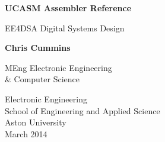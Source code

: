 %
%
%
\begin{titlepage}
  \begin{center}
    \vspace*{1cm}

    \Huge
    \textbf{UCASM Assembler Reference}

    \vspace{0.5cm}
    \LARGE
    EE4DSA Digital Systems Design

    \vspace{1.5cm}

    \textbf{Chris Cummins}

    \vfill

    MEng Electronic Engineering\\
    \& Computer Science

    \vspace{0.8cm}

    \Large
    Electronic Engineering\\
    School of Engineering and Applied Science\\
    Aston University\\
    March 2014

  \end{center}
\end{titlepage}
